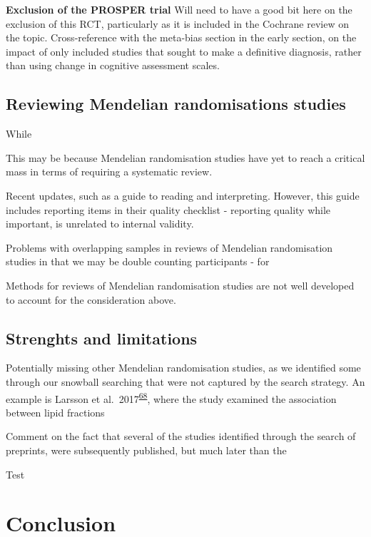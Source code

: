 \documentclass[a4paper, twoside]{templates/ociamthesis}
\begin{document}
\textbf{Exclusion of the PROSPER trial} Will need to have a good bit here on the exclusion of this RCT, particularly as it is included in the Cochrane review on the topic. Cross-reference with the meta-bias section in the early section, on the impact of only included studies that sought to make a definitive diagnosis, rather than using change in cognitive assessment scales.

\hypertarget{reviewing-mendelian-randomisations-studies}{%
\subsection{Reviewing Mendelian randomisations studies}\label{reviewing-mendelian-randomisations-studies}}

While

This may be because Mendelian randomisation studies have yet to reach a critical mass in terms of requiring a systematic review.

Recent updates, such as a guide to reading and interpreting. However, this guide includes reporting items in their quality checklist - reporting quality while important, is unrelated to internal validity.

Problems with overlapping samples in reviews of Mendelian randomisation studies in that we may be double counting participants - for

Methods for reviews of Mendelian randomisation studies are not well developed to account for the consideration above.

\hypertarget{strenghts-and-limitations}{%
\subsection{Strenghts and limitations}\label{strenghts-and-limitations}}

Potentially missing other Mendelian randomisation studies, as we identified some through our snowball searching that were not captured by the search strategy. An example is Larsson et al.~2017\textsuperscript{\protect\hyperlink{ref-larsson2017a}{68}}, where the study examined the association between lipid fractions

Comment on the fact that several of the studies identified through the search of preprints, were subsequently published, but much later than the

Test

\hypertarget{conclusion}{%
\section{Conclusion}\label{conclusion}}
\end{document}
